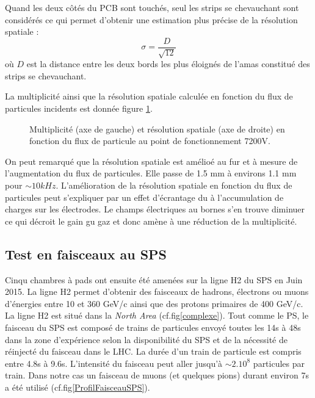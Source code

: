 Quand les deux côtés du PCB sont touchés, seul les strips se chevauchant sont considérés ce qui permet d'obtenir une estimation plus précise de la résolution spatiale :
\begin{equation}
\sigma=\frac{D}{\sqrt{12}}
\end{equation} 
où $D$ est la distance entre les deux bords les plus éloignés de l'amas constitué des strips se chevauchant.

La multiplicité ainsi que la résolution spatiale calculée en fonction du flux de particules incidents est donnée figure \ref{ResoSpatialPS}. 

\begin{figure}[!ht]
	\centering
	\scalebox{1.4}{}
	\caption{Multiplicité (axe de gauche) et résolution spatiale (axe de droite) en fonction du flux de particule au point de fonctionnement 7200V.}
	\label{ResoSpatialPS}
\end{figure}

On peut remarqué que la résolution spatiale est amélioé au fur et à mesure de l'augmentation du flux de particules. Elle passe de 1.5 mm à environs 1.1 mm pour $\sim 10kHz$. L'amélioration de la résolution spatiale en fonction du flux de particules peut s'expliquer par un effet d'écrantage du à l'accumulation de charges sur les électrodes. Le champs électriques au bornes s'en trouve diminuer ce qui décroit le gain gu gaz et donc amène à une réduction de la multiplicité.

\subsection{Test en faisceaux au SPS} 
Cinqu chambres à pads ont ensuite été amenées sur la ligne H2 \cite{H2line} du SPS en Juin 2015. La ligne H2 permet d'obtenir des faisceaux de hadrons, électrons ou muons d'énergies entre 10 et 360 GeV/c ainsi que des protons primaires de 400 GeV/c. La ligne H2 est situé dans la \textit{North Area} (cf.fig\ref{complexe}). Tout comme le PS, le faisceau du SPS est composé de trains de particules envoyé toutes les 14s à 48s dans la zone d’expérience selon la disponibilité du SPS et de la nécessité de réinjecté du faisceau dans le LHC. La durée d’un train de particule est compris entre 4.8s à 9.6s. L'intensité du faisceau peut aller jusqu'à $\sim 2.10^{8}$ particules par train. Dans notre cas un faisceau de muons (et quelques pions) durant environ 7s a été utilisé (cf.fig\ref{ProfilFaisceauSPS}).

